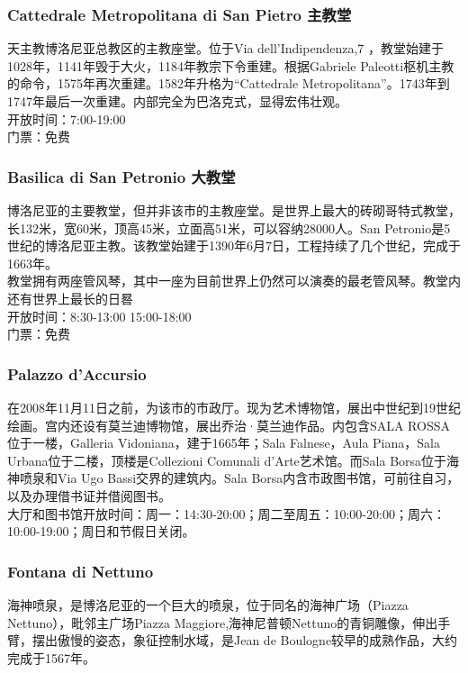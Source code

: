 \subsubsection{Cattedrale Metropolitana di San Pietro 主教堂}
天主教博洛尼亚总教区的主教座堂。位于Via dell'Indipendenza,7 ，教堂始建于1028年，1141年毁于大火，1184年教宗下令重建。根据Gabriele Paleotti枢机主教的命令，1575年再次重建。1582年升格为“Cattedrale Metropolitana”。1743年到1747年最后一次重建。内部完全为巴洛克式，显得宏伟壮观。\\
开放时间：7:00-19:00\\
门票：免费

\subsubsection{Basilica di San Petronio 大教堂}
博洛尼亚的主要教堂，但并非该市的主教座堂。是世界上最大的砖砌哥特式教堂，长132米，宽60米，顶高45米，立面高51米，可以容纳28000人。San Petronio是5世纪的博洛尼亚主教。该教堂始建于1390年6月7日，工程持续了几个世纪，完成于1663年。\\
教堂拥有两座管风琴，其中一座为目前世界上仍然可以演奏的最老管风琴。教堂内还有世界上最长的日晷\\
开放时间：8:30-13:00 15:00-18:00\\
门票：免费

\subsubsection{Palazzo d'Accursio}
在2008年11月11日之前，为该市的市政厅。现为艺术博物馆，展出中世纪到19世纪绘画。宫内还设有莫兰迪博物馆，展出乔治·莫兰迪作品。内包含SALA ROSSA位于一楼，Galleria Vidoniana，建于1665年；Sala Falnese，Aula Piana，Sala Urbana位于二楼，顶楼是Collezioni Comunali d'Arte艺术馆。而Sala Borsa位于海神喷泉和Via Ugo Bassi交界的建筑内。Sala Borsa内含市政图书馆，可前往自习，以及办理借书证并借阅图书。\\
大厅和图书馆开放时间：周一：14:30-20:00；周二至周五：10:00-20:00；周六：10:00-19:00；周日和节假日关闭。\\

\subsubsection{Fontana di Nettuno}
海神喷泉，是博洛尼亚的一个巨大的喷泉，位于同名的海神广场（Piazza Nettuno），毗邻主广场Piazza Maggiore,海神尼普顿Nettuno的青铜雕像，伸出手臂，摆出傲慢的姿态，象征控制水域，是Jean de Boulogne较早的成熟作品，大约完成于1567年。

